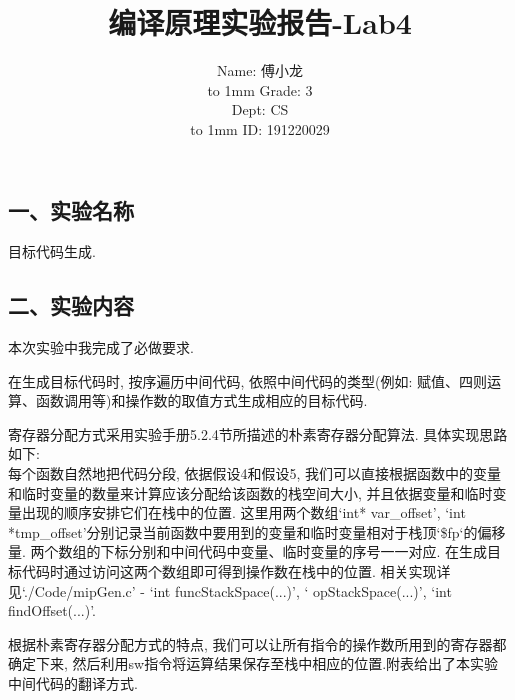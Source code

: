 \documentclass[a4paper,UTF8]{article}
\theoremstyle{definition}
\begin{document}
\begin{CJK}{UTF8}{gkai}
\title{编译原理实验报告-Lab4}
\author{
    \begin{minipage}[b]{0.3\linewidth}
      \begin{flushright}
        Name: 傅小龙\\%
        \vbox to 1mm{}
        Grade: 3%
      \end{flushright}
    \end{minipage}
    \hfill
    \begin{minipage}[b]{0.3\linewidth}
      \begin{flushright}
        Dept: CS\\%
        \vbox to 1mm{}
        ID: 191220029%
      \end{flushright}
    \end{minipage}
}
\date{}
\maketitle

\setlength{\baselineskip}{18pt}
\begin{flushleft}
\begin{CJK*}{UTF8}{gbsn}
\section*{一、实验名称}
\end{CJK*}
\end{flushleft}
目标代码生成.\\

\begin{CJK*}{UTF8}{gbsn}
\section*{二、实验内容}
\end{CJK*}
\par
本次实验中我完成了必做要求.
\par
在生成目标代码时, 按序遍历中间代码, 依照中间代码的类型(例如: 赋值、四则运算、函数调用等)和操作数的取值方式生成相应的目标代码.
\par
寄存器分配方式采用实验手册5.2.4节所描述的朴素寄存器分配算法. 具体实现思路如下:\\
每个函数自然地把代码分段, 依据假设4和假设5, 我们可以直接根据函数中的变量和临时变量的数量来计算应该分配给该函数的栈空间大小, 并且依据变量和临时变量出现的顺序安排它们在栈中的位置. 这里用两个数组`int* var\_offset', `int *tmp\_offset'分别记录当前函数中要用到的变量和临时变量相对于栈顶`\$fp`的偏移量. 两个数组的下标分别和中间代码中变量、临时变量的序号一一对应. 在生成目标代码时通过访问这两个数组即可得到操作数在栈中的位置. 相关实现详见`./Code/mipGen.c' - `int funcStackSpace(...)', ` opStackSpace(...)', `int findOffset(...)'.
\par
	根据朴素寄存器分配方式的特点, 我们可以让所有指令的操作数所用到的寄存器都确定下来, 然后利用sw指令将运算结果保存至栈中相应的位置.附表给出了本实验中间代码的翻译方式.\\


\end{CJK}
\end{document}
